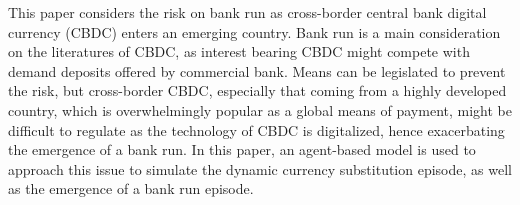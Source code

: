 This paper considers the risk on bank run as cross-border central bank digital
currency (CBDC) enters an emerging country. Bank run is a main consideration on
the literatures of CBDC, as interest bearing CBDC might compete with demand
deposits offered by commercial bank. Means can be legislated to prevent the
risk, but cross-border CBDC, especially that coming from a highly developed
country, which is overwhelmingly popular as a global means of payment, might be
difficult to regulate as the technology of CBDC is digitalized, hence
exacerbating the emergence of a bank run. In this paper, an agent-based model is
used to approach this issue to simulate the dynamic currency substitution episode,
as well as the emergence of a bank run episode. 
